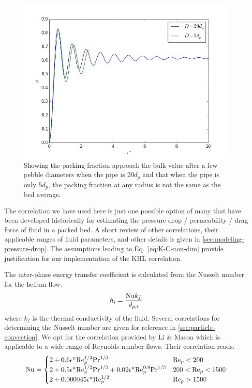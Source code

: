 \begin{figure}[htbp]
\begin{center}
	\includegraphics[width = \singleimagewidth]{chapters/figures/annular-packing-fraction.png}
	\caption{Showing the packing fraction approach the bulk value after a few pebble diameters when the pipe is 20$d_p$ and that when the pipe is only 5$d_p$, the packing fraction at any radius is not the same as the bed average.}
	\label{fig:packingDist}
\end{center}
\end{figure}

The correlation we have used here is just one possible option of many that have been developed historically for estimating the pressure drop / permeability / drag force of fluid in a packed bed. A short review of other correlations, their applicable ranges of fluid parameters, and other details is given in \cref{sec:modeling-pressure-drop}. The assumptions leading to Eq.~\ref{eq:K-C-non-dim} provide justification for our implementation of the KHL correlation.
\FloatBarrier



The inter-phase energy transfer coefficient is calculated from the Nusselt number for the helium flow.
\begin{equation}\label{eq:interphase-energy}
	h_i = \frac{\mathrm{Nu} k_f}{d_{p,i}}
\end{equation}
where $k_f$ is the thermal conductivity of the fluid. Several correlations for determining the Nusselt number are given for reference in \cref{sec:particle-convection}. We opt for the correlation provided by Li \& Mason which is applicable to a wide range of Reynolds number flows.\cite{Li2000} Their correlation reads,
\begin{equation}\label{eq:li-mason-correlation}
	\mathrm{Nu} = \begin{cases}
	2+ 0.6\epsilon^n\mathrm{Re}_p^{1/2}\mathrm{Pr}^{1/3} 										& \mathrm{Re}_p < 200\\
	2+ 0.5\epsilon^n\mathrm{Re}_p^{1/2}\mathrm{Pr}^{1/3} + 0.02 \epsilon^n \mathrm{Re}_p^{0.8}\mathrm{Pr}^{1/3} & 200 < \mathrm{Re}_p < 1500\\
	2+ 0.000045\epsilon^n\mathrm{Re}_p^{1/2}			 								& \mathrm{Re}_p > 1500
	\end{cases}
\end{equation}

